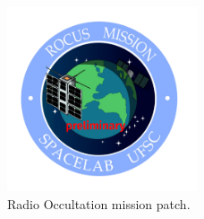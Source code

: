\begin{figure}[!htb]
    \begin{center}
        \includegraphics[width=0.5\textwidth]{figures/rocus-patch.png}
        \caption{Radio Occultation mission patch.}
        \label{fig:mission-patch}
    \end{center}
\end{figure}
